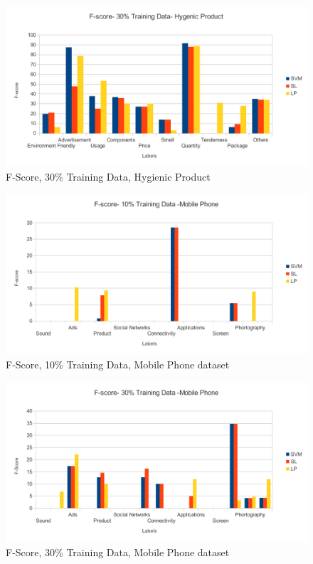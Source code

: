 \documentclass[4pt,a4paper,twocolumn]{article}
\begin{document}
\begin{figure}[]
  
  \centering
    \includegraphics[scale=0.7]{graphics/terra/fscore-terra-30}
    \caption{F-Score, 30\% Training Data, Hygienic Product}
   \label{fig:terra_30_fscore}  
\end{figure}




\begin{figure}[]
  
  \centering
    \includegraphics[scale=0.7]{graphics/sony/halfData/fscore-10-sony}
    \caption{F-Score, 10\% Training Data, Mobile Phone dataset}
   \label{fig:sony_10_fscore_half}  
\end{figure}

\begin{figure}[]
  
  \centering
    \includegraphics[scale=0.7]{graphics/sony/halfData/fscore-30-sony}
    \caption{F-Score, 30\% Training Data, Mobile Phone dataset}
   \label{fig:sony_30_fscore_half}  
\end{figure}
\end{document}
